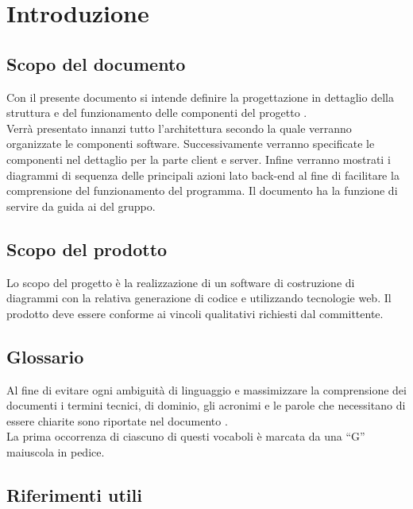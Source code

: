 \documentclass[../DefinizioneDiProdotto.tex]{subfiles}
\begin{document}
	\section{Introduzione}
		\subsection{Scopo del documento} 
			Con il presente documento si intende definire la progettazione in dettaglio della struttura e del funzionamento delle componenti del progetto \progetto.\\
			Verrà presentato innanzi tutto l'architettura secondo la quale verranno
			organizzate le componenti software. Successivamente verranno specificate le componenti nel dettaglio per la parte client e server.
			Infine verranno mostrati i diagrammi di sequenza delle principali azioni lato back-end al fine di facilitare la comprensione del funzionamento del programma. %
			Il documento ha la funzione di servire da guida ai \programmatori del gruppo.
		\subsection{Scopo del prodotto}
			Lo scopo del progetto è la realizzazione di un software di
			costruzione di diagrammi  con la relativa generazione
			di codice  e  utilizzando tecnologie
			web. Il prodotto deve essere conforme ai vincoli qualitativi
			richiesti dal committente.
		\subsection{Glossario}
			Al fine di evitare ogni ambiguità di linguaggio e massimizzare la
			comprensione dei documenti i termini tecnici, di dominio, gli
			acronimi e le parole che necessitano di essere chiarite sono
			riportate nel documento \glossariov.\\
			La prima occorrenza di ciascuno di questi vocaboli è
			marcata da una ``G'' maiuscola in pedice.
		\subsection{Riferimenti utili}
\end{document}
